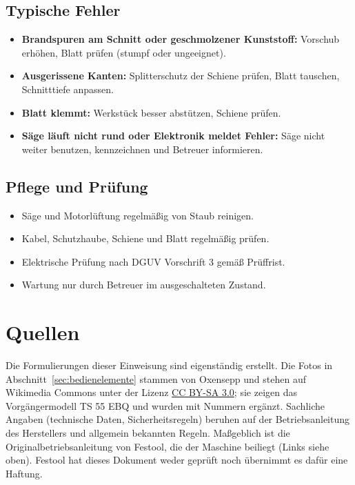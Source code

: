 \documentclass{\basedir/fablab-document}
\begin{document}
	\subsection{Typische Fehler}
	\begin{itemize}
		\item \textbf{Brandspuren am Schnitt oder geschmolzener Kunststoff:} Vorschub erhöhen, Blatt prüfen (stumpf oder ungeeignet).
		\item \textbf{Ausgerissene Kanten:} Splitterschutz der Schiene prüfen, Blatt tauschen, Schnitttiefe anpassen.
		\item \textbf{Blatt klemmt:} Werkstück besser abstützen, Schiene prüfen.
		\item \textbf{Säge läuft nicht rund oder Elektronik meldet Fehler:} Säge nicht weiter benutzen, kennzeichnen und Betreuer informieren.
	\end{itemize}

	\subsection{Pflege und Prüfung}
	\begin{itemize}
		\item Säge und Motorlüftung regelmäßig von Staub reinigen.
		\item Kabel, Schutzhaube, Schiene und Blatt regelmäßig prüfen.
		\item Elektrische Prüfung nach DGUV Vorschrift 3 gemäß Prüffrist.
		\item Wartung nur durch Betreuer im ausgeschalteten Zustand.
	\end{itemize}

	\section{Quellen}
	Die Formulierungen dieser Einweisung sind eigenständig erstellt. Die Fotos in Abschnitt~\ref{sec:bedienelemente} stammen von Oxensepp und stehen auf Wikimedia Commons unter der Lizenz \href{https://creativecommons.org/licenses/by-sa/3.0/}{CC BY-SA 3.0}; sie zeigen das Vorgängermodell TS 55 EBQ und wurden mit Nummern ergänzt. Sachliche Angaben (technische Daten, Sicherheitsregeln) beruhen auf der Betriebsanleitung des Herstellers und allgemein bekannten Regeln. Maßgeblich ist die Originalbetriebsanleitung von Festool, die der Maschine beiliegt (Links siehe oben). Festool hat dieses Dokument weder geprüft noch übernimmt es dafür eine Haftung.

\end{document}
